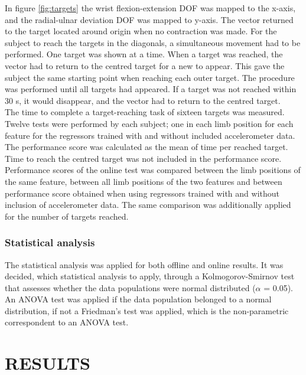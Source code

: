 \begin{multicols}{2}
In figure \ref{fig:targets} the wrist flexion-extension DOF was mapped to the x-axis, and the radial-ulnar deviation DOF was mapped to y-axis. The vector returned to the target located around origin when no contraction was made. For the subject to reach the targets in the diagonals, a simultaneous movement had to be performed. One target was shown at a time. When a target was reached, the vector had to return to the centred target for a new to appear. This gave the subject the same starting point when reaching each outer target. The procedure was performed until all targets had appeared. If a target was not reached within 30 s, it would disappear, and the vector had to return to the centred target. \\
The time to complete a target-reaching task of sixteen targets was measured. Twelve tests were performed by each subject; one in each limb position for each feature for the regressors trained with and without included accelerometer data. The performance score was calculated as the mean of time per reached target. Time to reach the centred target was not included in the performance score. Performance scores of the online test was compared between the limb positions of the same feature, between all limb positions of the two features and between performance score obtained when using regressors trained with and without inclusion of accelerometer data. The same comparison was additionally applied for the number of targets reached.

\subsubsection*{Statistical analysis}
The statistical analysis was applied for both offline and online results. It was decided, which statistical analysis to apply, through a Kolmogorov-Smirnov test that assesses whether the data populations were normal distributed ($\alpha$ = 0.05). An ANOVA test was applied if the data population belonged to a normal distribution, if not a Friedman's test was applied, which is the non-parametric correspondent to an ANOVA test. 




\section*{RESULTS}%


\end{multicols}
